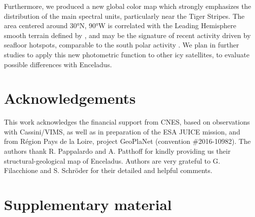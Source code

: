 \documentclass{arxiv-icarus}
\begin{document}
Furthermore, we produced a new global color map which strongly emphasizes the distribution of the main spectral units, particularly near the Tiger Stripes. The area centered around \ang{30}N, \ang{90}W is correlated with the Leading Hemisphere smooth terrain defined by \cite{Crow-Willard2015}, and may be the signature of recent activity driven by seafloor hotspots, comparable to the south polar activity \citep{Choblet2017}. We plan in further studies to apply this new photometric function to other icy satellites, to evaluate possible differences with Enceladus.

\section*{Acknowledgements}

This work acknowledges the financial support from CNES, based on observations with Cassini/VIMS, as well as in preparation of the ESA JUICE mission, and from R\'{e}gion Pays de la Loire, project GeoPlaNet (convention \#2016-10982). The authors thank R. Pappalardo and A. Patthoff for kindly providing us their structural-geological map of Enceladus. Authors are very grateful to G. Filacchione and S. Schr\"{o}der for their detailed and helpful comments.

\vfill\null





\onecolumn
\appendix
\section{Supplementary material}
\setcounter{figure}{0}
\end{document}
